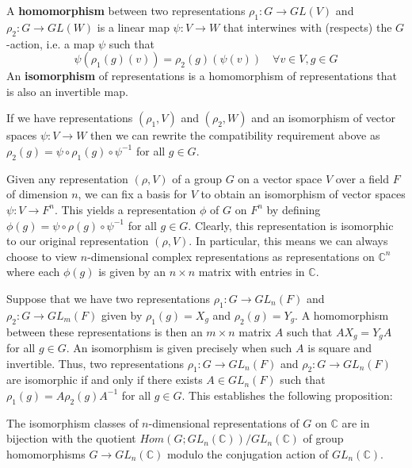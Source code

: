 
\begin{defn}
A \textbf{homomorphism} between two representations $\rho_1 \colon G \to GL(V)$ and $\rho_2 \colon G \to GL(W)$ is a linear map $\psi \colon V \to W$ that interwines with (respects) the $G$-action, i.e. a map $\psi$ such that \[ \psi ( \rho_1 (g)(v)) = \rho_2(g) (\psi(v)) \quad \forall v \in V, g \in G \]  An \textbf{isomorphism} of representations is a homomorphism of representations that is also an invertible map.
\end{defn}
\begin{note}
If we have representations $(\rho_1, V)$ and $(\rho_2, W)$ and an isomorphism of vector spaces $\psi \colon V \to W$ then we can rewrite the compatibility requirement above as $\rho_2(g) = \psi \circ \rho_1(g) \circ \psi^{-1}$ for all $g \in G$.
\end{note}

Given any representation $(\rho, V)$ of a group $G$ on a vector space $V$ over a field $F$ of dimension $n$, we can fix a basis for $V$ to obtain an isomorphism of vector spaces $\psi \colon V \to F^n$.  This yields a representation $\phi$ of $G$ on $F^n$ by defining $\phi (g) = \psi \circ \rho(g) \circ \psi^{-1}$ for all $g \in G$. Clearly, this representation is isomorphic to our original representation $(\rho, V)$. In particular, this means we can always choose to view $n$-dimensional complex representations as representations on $\mathbb{C}^n$ where each $\phi(g)$ is given by an $n \times n$ matrix with entries in $\mathbb{C}$.

Suppose that we have two representations $\rho_1 \colon G \to GL_n(F)$ and $\rho_2 \colon G \to GL_m(F)$ given by $\rho_1(g) = X_g$ and $\rho_2(g) = Y_g$.  A homomorphism between these representations is then an $m \times n$ matrix $A$ such that $A X_g = Y_g A$ for all $g \in G$.   An isomorphism is given precisely when such $A$ is square and invertible.  Thus, two representations $\rho_1 \colon G \to GL_n(F)$ and $\rho_2 \colon G \to GL_n(F)$ are isomorphic if and only if there exists $A \in GL_n(F)$ such that $\rho_1(g) = A \rho_2(g) A^{-1}$ for all $g \in G$.  This establishes the following proposition:
\begin{prop}
The isomorphism classes of $n$-dimensional representations of $G$ on $\mathbb{C}$ are in bijection with the quotient $Hom(G; GL_n(\mathbb{C})) / GL_n(\mathbb{C})$ of group homomorphisms $G \to GL_n(\mathbb{C})$ modulo the conjugation action of $GL_n(\mathbb{C})$.
\end{prop}



